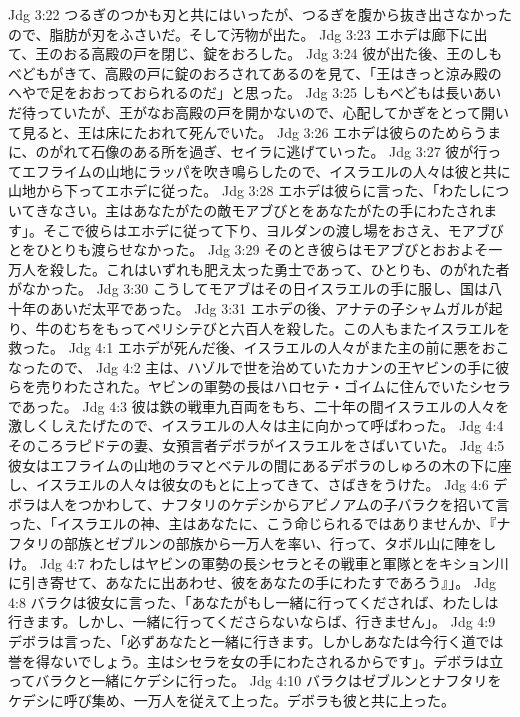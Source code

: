 Jdg 3:22  つるぎのつかも刃と共にはいったが、つるぎを腹から抜き出さなかったので、脂肪が刃をふさいだ。そして汚物が出た。
Jdg 3:23  エホデは廊下に出て、王のおる高殿の戸を閉じ、錠をおろした。
Jdg 3:24  彼が出た後、王のしもべどもがきて、高殿の戸に錠のおろされてあるのを見て、「王はきっと涼み殿のへやで足をおおっておられるのだ」と思った。
Jdg 3:25  しもべどもは長いあいだ待っていたが、王がなお高殿の戸を開かないので、心配してかぎをとって開いて見ると、王は床にたおれて死んでいた。
Jdg 3:26  エホデは彼らのためらうまに、のがれて石像のある所を過ぎ、セイラに逃げていった。
Jdg 3:27  彼が行ってエフライムの山地にラッパを吹き鳴らしたので、イスラエルの人々は彼と共に山地から下ってエホデに従った。
Jdg 3:28  エホデは彼らに言った、「わたしについてきなさい。主はあなたがたの敵モアブびとをあなたがたの手にわたされます」。そこで彼らはエホデに従って下り、ヨルダンの渡し場をおさえ、モアブびとをひとりも渡らせなかった。
Jdg 3:29  そのとき彼らはモアブびとおおよそ一万人を殺した。これはいずれも肥え太った勇士であって、ひとりも、のがれた者がなかった。
Jdg 3:30  こうしてモアブはその日イスラエルの手に服し、国は八十年のあいだ太平であった。
Jdg 3:31  エホデの後、アナテの子シャムガルが起り、牛のむちをもってペリシテびと六百人を殺した。この人もまたイスラエルを救った。
Jdg 4:1  エホデが死んだ後、イスラエルの人々がまた主の前に悪をおこなったので、
Jdg 4:2  主は、ハゾルで世を治めていたカナンの王ヤビンの手に彼らを売りわたされた。ヤビンの軍勢の長はハロセテ・ゴイムに住んでいたシセラであった。
Jdg 4:3  彼は鉄の戦車九百両をもち、二十年の間イスラエルの人々を激しくしえたげたので、イスラエルの人々は主に向かって呼ばわった。
Jdg 4:4  そのころラピドテの妻、女預言者デボラがイスラエルをさばいていた。
Jdg 4:5  彼女はエフライムの山地のラマとベテルの間にあるデボラのしゅろの木の下に座し、イスラエルの人々は彼女のもとに上ってきて、さばきをうけた。
Jdg 4:6  デボラは人をつかわして、ナフタリのケデシからアビノアムの子バラクを招いて言った、「イスラエルの神、主はあなたに、こう命じられるではありませんか、『ナフタリの部族とゼブルンの部族から一万人を率い、行って、タボル山に陣をしけ。
Jdg 4:7  わたしはヤビンの軍勢の長シセラとその戦車と軍隊とをキション川に引き寄せて、あなたに出あわせ、彼をあなたの手にわたすであろう』」。
Jdg 4:8  バラクは彼女に言った、「あなたがもし一緒に行ってくだされば、わたしは行きます。しかし、一緒に行ってくださらないならば、行きません」。
Jdg 4:9  デボラは言った、「必ずあなたと一緒に行きます。しかしあなたは今行く道では誉を得ないでしょう。主はシセラを女の手にわたされるからです」。デボラは立ってバラクと一緒にケデシに行った。
Jdg 4:10  バラクはゼブルンとナフタリをケデシに呼び集め、一万人を従えて上った。デボラも彼と共に上った。
